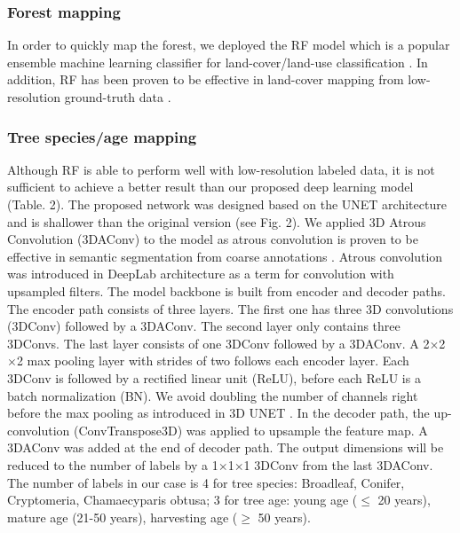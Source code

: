 \subsubsection*{Forest mapping}
In order to quickly map the forest, we deployed the RF model which is a popular ensemble machine learning classifier for land-cover/land-use classification \citep{gislason2006random}. In addition, RF has been proven to be effective in land-cover mapping from low-resolution ground-truth data \citep{robinson2021global}.\par
\subsubsection*{Tree species\slash age mapping}
Although RF is able to perform well with low-resolution labeled data, it is not sufficient to achieve a better result than our proposed deep learning model (Table. 2). The proposed network was designed based on the UNET architecture \citep{ronneberger2015u} and is shallower than the original version (see Fig. 2). We applied 3D Atrous Convolution (3DAConv) to the model as atrous convolution is proven to be effective in semantic segmentation from coarse annotations \citep{chen2017rethinking}. Atrous convolution was introduced in DeepLab architecture \citep{chen2017deeplab} as a term for convolution with upsampled filters. The model backbone is built from encoder and decoder paths. The encoder path consists of three layers. The first one has three 3D convolutions (3DConv) followed by a 3DAConv. The second layer only contains three 3DConvs. The last layer consists of one 3DConv followed by a 3DAConv. A 2$\times$2$\times$2 max pooling layer with strides of two follows each encoder layer. Each 3DConv is followed by a rectified linear unit (ReLU), before each ReLU is a batch normalization (BN). We avoid doubling the number of channels right before the max pooling as introduced in 3D UNET \citep{cciccek20163d}. In the decoder path, the up-convolution (ConvTranspose3D) was applied to upsample the feature map. A 3DAConv was added at the end of decoder path. The output dimensions will be reduced to the number of labels by a 1$\times$1$\times$1 3DConv from the last 3DAConv. The number of labels in our case is 4 for tree species: Broadleaf, Conifer, Cryptomeria, Chamaecyparis obtusa; 3 for tree age: young age ($\le$ 20 years), mature age (21-50 years), harvesting age ($\ge$ 50 years). \par

